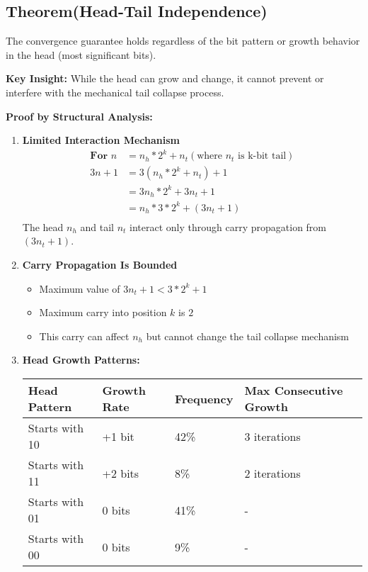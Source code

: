 \documentclass[10pt,letterpaper]{article}
\begin{document}
\subsection{Theorem(Head-Tail Independence)}

The convergence guarantee holds regardless of the bit pattern or growth behavior in the head (most significant bits).
\vspace{1em}

\textbf{Key Insight:} While the head can grow and change, it cannot prevent or interfere with the mechanical tail collapse process.

\vspace{1em}
\textbf{Proof by Structural Analysis:}

\begin{enumerate}
    \item \textbf{Limited Interaction Mechanism}
\[
\begin{aligned}
    \textbf{For }  n &= n_h * 2^k + n_t   (\text{where $n_t$ is k-bit tail})\\ 
    3n + 1 &= 3(n_h * 2^k + n_t) + 1\\
           &= 3n_h * 2^k + 3n_t + 1\\
           &= n_h * 3 * 2^k + (3n_t + 1) \\
\end{aligned}
\]
The head $n_h$ and tail $n_t$ interact only through carry propagation from $(3n_t + 1)$.

\item \textbf{Carry Propagation Is Bounded}
\begin{itemize}
    \item Maximum value of $3n_t + 1 < 3 * 2^k + 1$
    \item  Maximum carry into position $k$ is $2$
    \item This carry can affect $n_h$ but cannot change the tail collapse mechanism
\end{itemize}

\item \textbf{Head Growth Patterns:}

\begin{table}[H]
  \centering
  \begin{tabular}{|l|l|l|l|}
    \hline
    Head Pattern    & Growth Rate & Frequency & Max Consecutive Growth \\ \hline
    Starts with 10  & +1 bit      & 42\%      &  3 iterations \\ \hline
    Starts with 11  & +2 bits     & 8\%       & 2 iterations  \\ \hline
    Starts with 01  & 0 bits      & 41\%      & - \\ \hline
    Starts with 00  & 0 bits      & 9\%       & - \\ \hline
  \end{tabular}
\end{table}


\end{enumerate}
\end{document}
